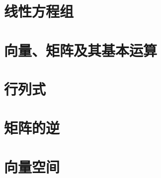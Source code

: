 
\chapter{线性方程组}




\chapter{向量、矩阵及其基本运算}









\chapter{行列式}







\chapter{矩阵的逆}





\chapter{向量空间}














